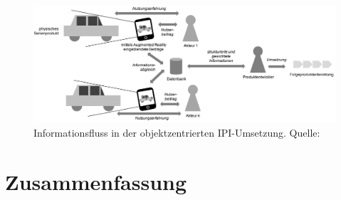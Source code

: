 \begin{figure}[H]
	\centering
	\includegraphics[width=1.0\textwidth]{resources/analyse/IPI_Objektzentriert.png}
	\caption{Informationsfluss  in der objektzentrierten IPI-Umsetzung. Quelle:\cite[S.~135]{Kirschner2012}}
	\label{img:objekt_centered_ipi}
\end{figure}





\section{Zusammenfassung}